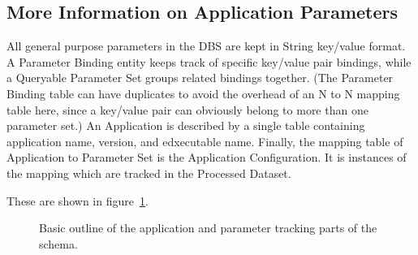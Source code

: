 \documentclass{cmspaper}
\begin{document}
\subsection{More Information on Application Parameters}

All general purpose parameters in the DBS are kept in String key/value 
format.  A Parameter Binding entity keeps track of specific key/value pair 
bindings, while a Queryable Parameter Set groups related bindings together. 
(The Parameter Binding table can have duplicates to avoid the overhead of 
an N to N mapping table here, since a key/value pair can obviously belong to 
more than one parameter set.) An Application is described by a single table 
containing application name, version, and edxecutable name.  Finally, the 
mapping table of Application to Parameter Set is the Application 
Configuration.  It is instances of the mapping which are tracked in the 
Processed Dataset.
 
These are shown in figure~\ref{fig:appl}.

\begin{figure}[hbtp]
  \begin{center}
    \caption{Basic outline of the application and parameter tracking parts of the schema. }
    \label{fig:appl}
  \end{center}
\end{figure}
\end{document}
